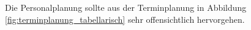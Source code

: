 Die Personalplanung sollte aus der Terminplanung in Abbildung \ref{fig:terminplanung_tabellarisch} sehr offensichtlich hervorgehen.